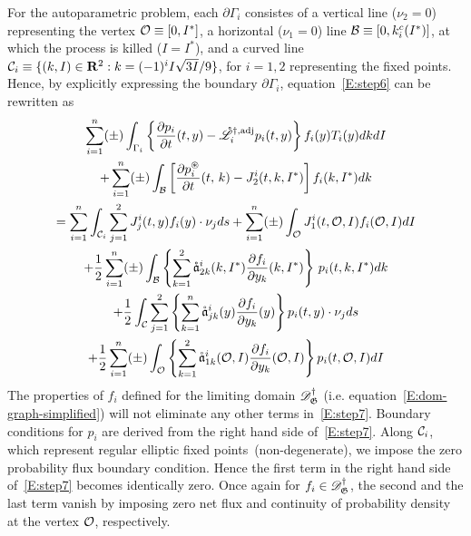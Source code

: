 For the autoparametric problem, each $\partial\Gamma_i$ consistes of a vertical line ($\nu_2=0$) representing the vertex ${\mathcal{O}}\equiv[0,I^*]$, a horizontal ($\nu_1=0$) line ${\mathcal B}\equiv[0,{k_i^c(I^*)}]$, at which the process is killed ($I=I^*$), and a curved line ${\mathcal C_i}\equiv \{(k,I)\in \mathbf R^2: k= (-1)^iI\sqrt{3I}/9\}$, for $i=1,2$ representing the fixed points. Hence, by explicitly expressing the boundary $\partial\Gamma_i$, equation~\eqref{E:step6} can be rewritten as
\begin{multline}
\sum_{i=1}^n (\pm) \int_{\Gamma_i} \left\{\frac{\partial p_i}{\partial t}(t,y) - \mathring {\mathscr L}^{\dagger,\text{adj}}_{i} p_{i} (t,y) \right\} f_i(y) T_{i}(y) dk dI\\
+ \sum_{i=1}^n (\pm) \int_{\mathcal B} \left[\frac{\partial p_i^\circledast}{\partial t}(t,\,k) - J_2^{i}(t,k,I^*) \right] f_i(k,I^*) dk\\
= \sum_{i=1}^n \int_{\mathcal C_i} \sum_{j=1}^2 J_j^i(t,y) f_i(y) \cdot \nu_j ds + \sum_{i=1}^n (\pm) \int_{\mathcal{O}} J_1^i(t,\mathcal{O},I) f_i(\mathcal{O},I) dI\\
+ \frac12 \sum_{i=1}^n (\pm) \int_{\mathcal B} \left\{\sum_{k=1}^2 \mathring{\mathfrak a}_{2k}^i(k,I^*) \frac{\partial f_i}{\partial y_k}(k,I^*)\right\}\, p_i(t, k, I^*) dk\\
+ \frac12 \int_{\mathcal C} \sum_{j=1}^2 \left\{\sum_{k=1}^n \mathring{\mathfrak a}_{jk}^i(y) \frac{\partial f_i}{\partial y_k}(y)\right\} p_{i}(t,y) \cdot \nu_j ds\\
+ \frac12 \sum_{i=1}^n (\pm) \int_{\mathcal{O}} \left\{ \sum_{k=1}^2 \mathring{\mathfrak a}_{1k}^i(\mathcal{O},I)
\frac{\partial f_i}{\partial y_k}(\mathcal{O},I)\right\} p_i(t,\mathcal{O},I) dI
\label{E:step7}
\end{multline}
The properties of $f_i$ defined for the limiting domain $\mathscr{D}_\mathfrak G^\dag$ (i.e. equation~\eqref{E:dom-graph-simplified}) will not eliminate any other terms in~\eqref{E:step7}. Boundary conditions for $p_i$ are derived from the right hand side of~\eqref{E:step7}. Along $\mathcal C_i$, which represent regular elliptic fixed points~(non-degenerate), we impose the zero probability flux boundary condition. Hence the first term in the right hand side of~\eqref{E:step7} becomes identically zero. Once again for $f_i \in \mathscr{D}_\mathfrak G^\dag$, the second and the last term vanish by imposing zero net flux and continuity of probability density at the vertex ${\mathcal{O}}$, respectively.

